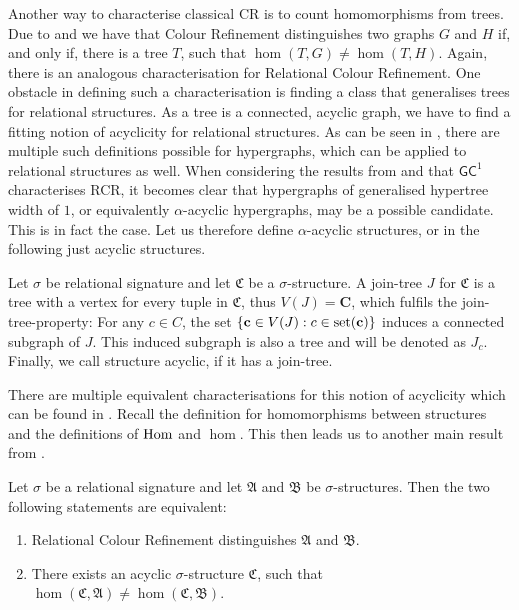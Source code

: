 Another way to characterise classical CR is to count homomorphisms from trees.
Due to \cite{dvorak2010RecognizingGraphsa} and \cite{dell2018LovaszMeets} we have that Colour Refinement distinguishes two graphs $G$ and $H$ if, and only if, there is a tree $T$, such that $\hom(T,G)\neq\hom(T,H)$.
Again, there is an analogous characterisation for Relational Colour Refinement.
One obstacle in defining such a characterisation is finding a class that generalises trees for relational structures.
As a tree is a connected, acyclic graph, we have to find a fitting notion of acyclicity for relational structures.
As can be seen in \cite{brault-baron2014HypergraphAcyclicity}, there are multiple such definitions possible for hypergraphs, which can be applied to relational structures as well.
When considering the results from \cite{scheidt2023CountingHomomorphisms} and that $\mathsf{GC}^1$ characterises RCR, it becomes clear that hypergraphs of generalised hypertree width of $1$, or equivalently $\alpha$-acyclic hypergraphs, may be a possible candidate.
This is in fact the case.
Let us therefore define $\alpha$-acyclic structures, or in the following just acyclic structures.

\begin{definition}
	Let $\sigma$ be relational signature and let $\mathfrak C$ be a $\sigma$-structure.
	A join-tree $J$ for $\mathfrak C$ is a tree with a vertex for every tuple in $\mathfrak C$, thus $V(J)=\mathbf C$, which fulfils the join-tree-property:
	For any $c\in C$, the set $\{\mathbf c \in V(J) : c\in \operatorname{set}(\mathbf c)\}$ induces a connected subgraph of $J$.
	This induced subgraph is also a tree and will be denoted as $J_c$.
	Finally, we call structure acyclic, if it has a join-tree.
\end{definition}
There are multiple equivalent characterisations for this notion of acyclicity which can be found in \cite{brault-baron2014HypergraphAcyclicity}.
Recall the definition for homomorphisms between structures and the definitions of $\operatorname{Hom}$ and $\hom$.
This then leads us to another main result from \cite{scheidt2025ColorRefinement}.

\begin{theorem}
	Let $\sigma$ be a relational signature and let $\mathfrak A$ and $\mathfrak B$ be $\sigma$-structures.
	Then the two following statements are equivalent:
	\begin{enumerate}
		\item Relational Colour Refinement distinguishes $\mathfrak A$ and $\mathfrak B$.
		\item There exists an acyclic $\sigma$-structure $\mathfrak C$, such that $\hom(\mathfrak C,\mathfrak A)\neq\hom(\mathfrak C,\mathfrak B)$.
	\end{enumerate}
\end{theorem}

